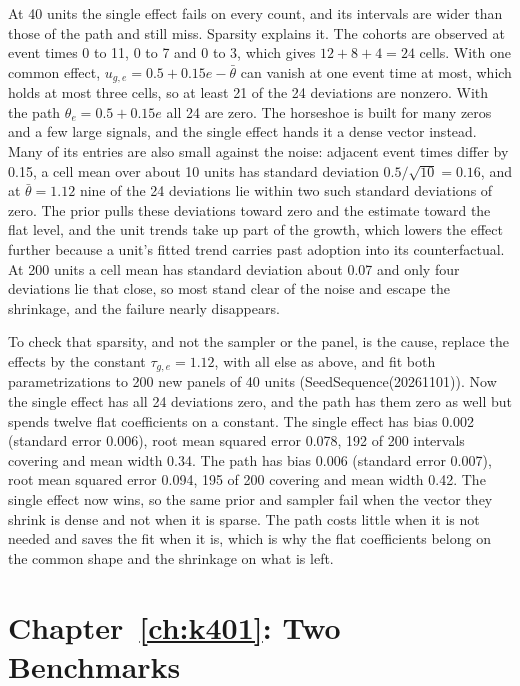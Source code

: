 At 40 units the single effect fails on every count, and its intervals are wider than those of the path and still miss. Sparsity explains it. The cohorts are observed at event times 0 to 11, 0 to 7 and 0 to 3, which gives $12 + 8 + 4 = 24$ cells. With one common effect, $u_{g,e} = 0.5 + 0.15e - \bar\theta$ can vanish at one event time at most, which holds at most three cells, so at least 21 of the 24 deviations are nonzero. With the path $\theta_e = 0.5 + 0.15e$ all 24 are zero. The horseshoe is built for many zeros and a few large signals, and the single effect hands it a dense vector instead. Many of its entries are also small against the noise: adjacent event times differ by 0.15, a cell mean over about 10 units has standard deviation $0.5/\sqrt{10} = 0.16$, and at $\bar\theta = 1.12$ nine of the 24 deviations lie within two such standard deviations of zero. The prior pulls these deviations toward zero and the estimate toward the flat level, and the unit trends take up part of the growth, which lowers the effect further because a unit's fitted trend carries past adoption into its counterfactual. At 200 units a cell mean has standard deviation about 0.07 and only four deviations lie that close, so most stand clear of the noise and escape the shrinkage, and the failure nearly disappears.

To check that sparsity, and not the sampler or the panel, is the cause, replace the effects by the constant $\tau_{g,e} = 1.12$, with all else as above, and fit both parametrizations to 200 new panels of 40 units (SeedSequence(20261101)). Now the single effect has all 24 deviations zero, and the path has them zero as well but spends twelve flat coefficients on a constant. The single effect has bias 0.002 (standard error 0.006), root mean squared error 0.078, 192 of 200 intervals covering and mean width 0.34. The path has bias 0.006 (standard error 0.007), root mean squared error 0.094, 195 of 200 covering and mean width 0.42. The single effect now wins, so the same prior and sampler fail when the vector they shrink is dense and not when it is sparse. The path costs little when it is not needed and saves the fit when it is, which is why the flat coefficients belong on the common shape and the shrinkage on what is left.

\section*{Chapter~\ref{ch:k401}: Two Benchmarks}

